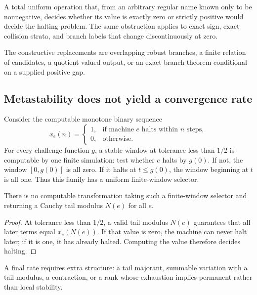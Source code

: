 \begin{barrier}
A total uniform operation that, from an arbitrary regular name known only to be nonnegative, decides whether its value is exactly zero or strictly positive would decide the halting problem.  The same obstruction applies to exact sign, exact collision strata, and branch labels that change discontinuously at zero.
\end{barrier}

The constructive replacements are overlapping robust branches, a finite relation of candidates, a quotient-valued output, or an exact branch theorem conditional on a supplied positive gap.

\subsection{Metastability does not yield a convergence rate}

Consider the computable monotone binary sequence
\[
 x_e(n)=
 \begin{cases}
  1,&\text{if machine }e\text{ halts within }n\text{ steps},\\
  0,&\text{otherwise}.
 \end{cases}
\]
For every challenge function \(g\), a stable window at tolerance less than \(1/2\) is computable by one finite simulation: test whether \(e\) halts by \(g(0)\).  If not, the window \([0,g(0)]\) is all zero.  If it halts at \(t\leq g(0)\), the window beginning at \(t\) is all one.  Thus this family has a uniform finite-window selector.

\begin{barrier}
There is no computable transformation taking such a finite-window selector and returning a Cauchy tail modulus \(N(e)\) for all \(e\).
\end{barrier}

\begin{proof}
At tolerance less than \(1/2\), a valid tail modulus \(N(e)\) guarantees that all later terms equal \(x_e(N(e))\).  If that value is zero, the machine can never halt later; if it is one, it has already halted.  Computing the value therefore decides halting.
\end{proof}

A final rate requires extra structure: a tail majorant, summable variation with a tail modulus, a contraction, or a rank whose exhaustion implies permanent rather than local stability.

